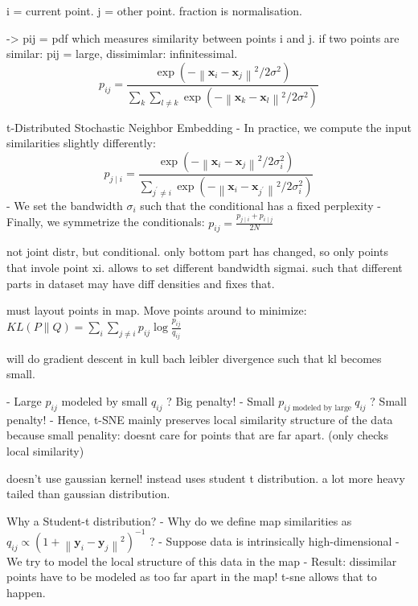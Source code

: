 		i = current point. j = other point.
		fraction is normalisation.
		
		-> pij = pdf which measures similarity between points i and j.
		if two points are similar: pij = large, dissimimlar: infinitessimal.
		$$
		p_{i j}=\frac{\exp \left(-\left\|\mathbf{x}_i-\mathbf{x}_j\right\|^2 / 2 \sigma^2\right)}{\sum_k \sum_{l \neq k} \exp \left(-\left\|\mathbf{x}_k-\mathbf{x}_l\right\|^2 / 2 \sigma^2\right)}
		$$
		
		t-Distributed Stochastic Neighbor Embedding
		- In practice, we compute the input similarities slightly differently:
		$$
		p_{j \mid i}=\frac{\exp \left(-\left\|\mathbf{x}_i-\mathbf{x}_j\right\|^2 / 2 \sigma_i^2\right)}{\sum_{j^{\prime} \neq i} \exp \left(-\left\|\mathbf{x}_i-\mathbf{x}_{j^{\prime}}\right\|^2 / 2 \sigma_i^2\right)}
		$$
		- We set the bandwidth $\sigma_i$ such that the conditional has a fixed perplexity
		- Finally, we symmetrize the conditionals: $p_{i j}=\frac{p_{j \mid i}+p_{i \mid j}}{2 N}$
		
		not joint distr, but conditional. only bottom part has changed, so only points that invole point xi.
		allows to set different bandwidth sigmai.
			such that different parts in dataset may have diff densities and fixes that.
			
			
		
		must layout points in map. Move points around to minimize: $K L(P \| Q)=\sum_i \sum_{j \neq i} p_{i j} \log \frac{p_{i j}}{q_{i j}}$
		
		will do gradient descent in kull bach leibler divergence such that kl becomes small.
			
			- Large $p_{i j}$ modeled by small $q_{i j}$ ? Big penalty!
			- Small $p_{i j \text { modeled by large }} q_{i j}$ ? Small penalty!
			- Hence, t-SNE mainly preserves local similarity structure of the data
				because small penality: doesnt care for points that are far apart. (only checks local similarity)
				
		doesn't use gaussian kernel! instead uses student t distribution.
		a lot more heavy tailed than gaussian distribution.
			
			
		Why a Student-t distribution?
		- Why do we define map similarities as $q_{i j} \propto\left(1+\left\|\mathbf{y}_i-\mathbf{y}_j\right\|^2\right)^{-1}$ ?
		- Suppose data is intrinsically high-dimensional
		- We try to model the local structure of this data in the map
		- Result: dissimilar points have to be modeled as too far apart in the map!
		t-sne allows that to happen.
		
